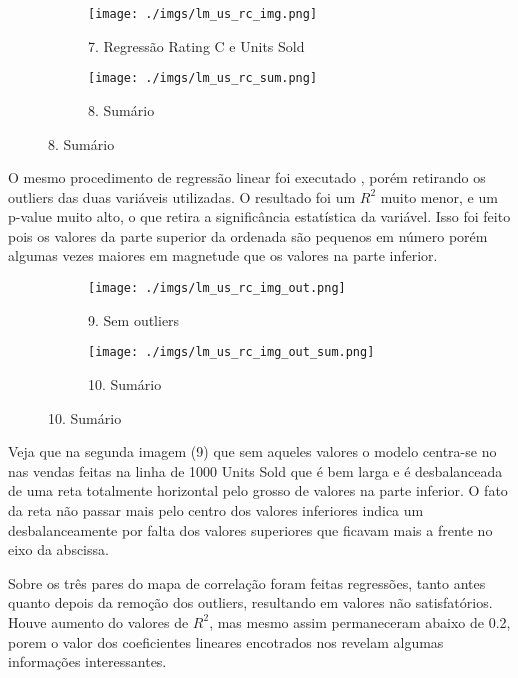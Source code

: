 \documentclass[12pt, a4paper]{article}
\begin{document}
\FloatBarrier
\begin{figure}[h]
	\hspace{1cm}
  \begin{subfigure}[b]{0.4\textwidth}
    \texttt{[image: ./imgs/lm\_us\_rc\_img.png]}
    \caption*{7. Regressão Rating C e Units Sold}
    \label{fig:1}
  \end{subfigure}
  \hspace{0.25cm}
  \begin{subfigure}[b]{0.45\textwidth}
    \texttt{[image: ./imgs/lm\_us\_rc\_sum.png]}
    \caption*{8. Sumário}
    \label{fig:2}
  \end{subfigure}
\end{figure}
\FloatBarrier

O mesmo procedimento de regressão linear foi executado , porém retirando os outliers das duas variáveis utilizadas. O resultado foi um $R^{2}$ muito menor, e um p-value muito alto, o que retira a significância estatística da variável. Isso foi feito pois os valores da parte superior da ordenada são pequenos em número porém algumas vezes maiores em magnetude que os valores na parte inferior.

\FloatBarrier
\begin{figure}[h]
	\hspace{1cm}
  \begin{subfigure}[b]{0.4\textwidth}
    \texttt{[image: ./imgs/lm\_us\_rc\_img\_out.png]}
    \caption*{9. Sem outliers}
    \label{fig:1}
  \end{subfigure}
  \hspace{0.5cm}
  \begin{subfigure}[b]{0.5\textwidth}
    \texttt{[image: ./imgs/lm\_us\_rc\_img\_out\_sum.png]}
    \caption*{10. Sumário}
    \label{fig:2}
  \end{subfigure}
\end{figure}
\FloatBarrier

Veja que na segunda imagem (9) que sem aqueles valores o modelo centra-se no nas vendas feitas na linha de 1000 Units Sold que é bem larga e é desbalanceada de uma reta totalmente horizontal pelo grosso de valores na parte inferior. O fato da reta não passar mais pelo centro dos valores inferiores indica um desbalanceamente por falta dos valores superiores que ficavam mais a frente no eixo da abscissa.

Sobre os três pares do mapa de correlação foram feitas regressões, tanto antes quanto depois da remoção dos outliers, resultando em valores não satisfatórios. Houve aumento do valores de $R^{2}$, mas mesmo assim permaneceram abaixo de 0.2, porem o valor dos coeficientes lineares encotrados nos revelam algumas informações interessantes.
\end{document}
